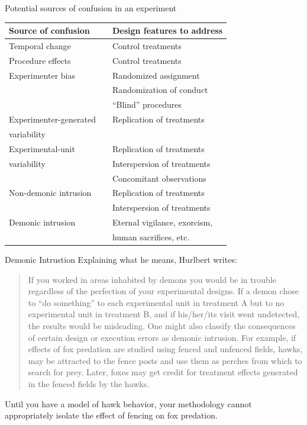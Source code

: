 \documentclass{beamer}
\begin{document}
\begin{frame}{Potential sources of confusion in an experiment}
\small
\begin{tabular}{p{}cp{}}\toprule
\textbf{Source of confusion} &  & \textbf{Design features to address}\\\midrule
 Temporal change  & & Control   treatments \\\midrule
 Procedure effects  & & Control   treatments \\\midrule
 Experimenter bias & & Randomized  assignment \\
 & & Randomization of  conduct\\
 & & ``Blind'' procedures \\\midrule
 Experimenter-generated  & & Replication of treatments \\
 variability & & \\ \midrule
 Experimental-unit  & & Replication of treatments\\
 variability & & Interspersion of treatments\\
  & & Concomitant  observations\\ \midrule
  Non-demonic intrusion & & Replication of   treatments\\
   & & Interspersion of treatments\\ \midrule
 Demonic intrusion & & Eternal vigilance, exorcism, \\& & human sacrifices, etc.\\ \bottomrule
\end{tabular}
\end{frame}

\begin{frame}{Demonic Intrustion}
Explaining what he means, Hurlbert writes:
\begin{quotation}
If you worked in areas inhabited by demons you would be in
trouble regardless of the perfection of your experimental designs. If a
demon chose to ``do something'' to each
experimental unit in treatment A but to no experimental unit in treatment B,
and if his/her/its visit went undetected, the results would be misleading.
One might also classify the consequences of certain design or execution
errors as demonic intrusion. \pause For example, if effects of fox predation are
studied using fenced and unfenced fields, hawks, may be attracted to the
fence posts and use them as perches from which to search for prey. Later,
foxes may get credit for treatment effects generated in the fenced fields by
the hawks.
\end{quotation}
\pause
Until you have a model of hawk behavior, your methodology cannot
appropriately isolate the effect of fencing on fox predation.
\end{frame}
\end{document}
